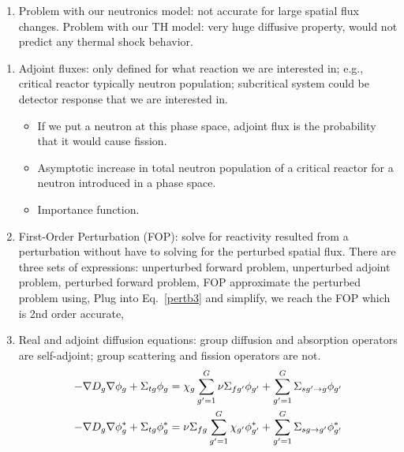 \documentclass{school-22.211-notes}
\begin{document}
\begin{enumerate}
  \item Problem with our neutronics model: not accurate for large spatial flux changes. Problem with our TH model: very huge diffusive property, would not predict any thermal shock behavior. 
\end{enumerate}



\clearpage
{}
\begin{enumerate}
\item Adjoint fluxes: only defined for what reaction we are interested in; e.g., critical reactor typically neutron population; subcritical system could be detector response that we are interested in.  
  \begin{itemize}
  \item If we put a neutron at this phase space, adjoint flux is the probability that it would cause fission. 
  \item Asymptotic increase in total neutron population of a critical reactor for a neutron introduced in a phase space.
  \item Importance function. 
  \end{itemize}
  
\item  First-Order Perturbation (FOP): solve for reactivity resulted from a perturbation without have to solving for the perturbed spatial flux. There are three sets of expressions: unperturbed forward problem, unperturbed adjoint problem, perturbed forward problem, 
FOP approximate the perturbed problem using, 
Plug into Eq.~\ref{pertb3} and simplify, we reach the FOP which is 2nd order accurate, 


  \item Real and adjoint diffusion equations: group diffusion and absorption operators are self-adjoint; group scattering and fission operators are not. 
    \begin{align}
      -\nabla D_g  \nabla \phi_g + \Sigma_{tg} \phi_g &= \chi_g \displaystyle\sum_{g'=1}^G \nu \Sigma_{fg'}  \phi_{g'} + \displaystyle\sum_{g'=1}^G \Sigma_{sg'\to g} \phi_{g'} \\
      -\nabla D_g  \nabla \phi_g^* + \Sigma_{tg}  \phi_g^* &= \nu \Sigma_{fg}  \displaystyle\sum_{g'=1}^G  \chi_{g'} \phi_{g'}^*  + \displaystyle\sum_{g'=1}^G \Sigma_{sg\to g'}  \phi_{g'}^*
    \end{align}


\end{enumerate}
\end{document}
